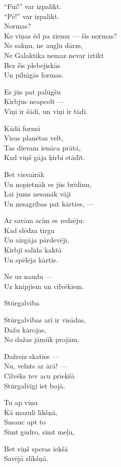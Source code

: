 \documentclass[14pt]{extarticle}
\begin{document}
``Fui!'' var izpalikt.\\
``Pē!'' var izpalikt.\\
Normas?\\
Ko viņas ēd pa ziemu --- šīs normas?\\
Ne sakņu, ne augļu dārzs,\\
Ne Galaktika nemaz nevar iztikt\\
Bez šīs plebejiskās\\
Un pilnīgās formas.

Es jūs pat palūgšu\\
Ķirbjus neapcelt ---\\
Viņi ir šādi, un viņi ir tādi.

Kādā formā\\
Visas planētas velt,\\
Tas dievam ienāca prātā,\\
Kad viņš gāja ķirbi stādīt.

Bet visvairāk\\
Un nopietnāk es jūs brīdinu,\\
Lai jums nesanāk vāji\\
Un nesagribas pat kārties, ---

Ar savām acīm es redzēju:\\
Kad slēdza tirgu\\
Un aizgāja pārdevēji,\\
Ķirbji salīda kaktā\\
Un spēlēja kārtis.

Ne uz naudu ---\\
Uz knipjiem un cilvēkiem.



\newpage

{\large \sc Stūrgalvība}

Stūrgalvības arī ir visādas,\\
Dažu kārojas,\\
No dažas jāmūk projām.

Dažreiz skaties ---\\
Nu, velnts ar ārā! ---\\
Cilvēks tev acu priekšā\\
Stūrgalvīgi iet bojā.

Tu ap viņu\\
Kā mazuli līkšņā,\\
Sasauc apt to\\
Simt gudro, simt meļu,

Bet viņš speras iekšā\\
Savējā slīkšņā.
\end{document}
